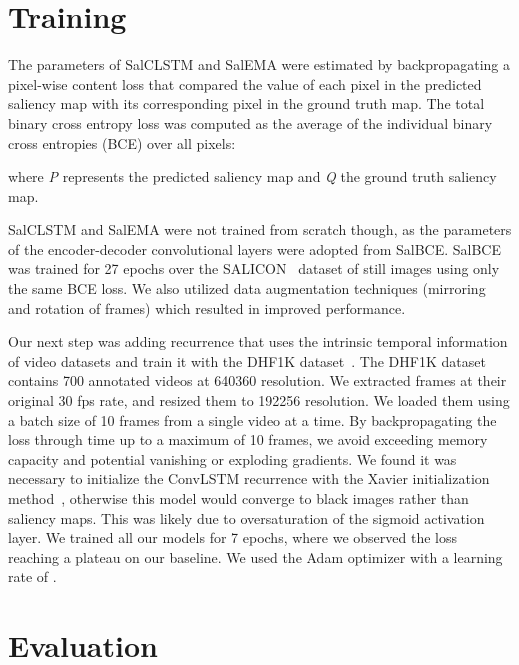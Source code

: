 \documentclass{bmvc2k}
\begin{document}
\section{Training}

The parameters of SalCLSTM and SalEMA were estimated by backpropagating a pixel-wise content loss that compared the value of each pixel in the predicted saliency map with its corresponding pixel in the ground truth map. The total binary cross entropy loss was computed as the average of the individual binary cross entropies (BCE) over all pixels:

where \textit{P} represents the predicted saliency map and {\it Q} the ground truth saliency map.

SalCLSTM and SalEMA were not trained from scratch though, as the parameters of the encoder-decoder convolutional layers were adopted from SalBCE.
SalBCE was trained for 27 epochs over the SALICON~\cite{SALICON} dataset of still images using only the same BCE loss. We also utilized data augmentation techniques (mirroring and rotation of frames) which resulted in improved performance.



Our next step was adding recurrence that uses the intrinsic temporal information of video datasets and train it with the DHF1K dataset~\cite{Wang2018a}. 
The DHF1K dataset \cite{Wang2018a} contains 700 annotated videos at 640360 resolution. We extracted frames at their original 30 fps rate, and resized them to 192256 resolution. We loaded them using a batch size of 10 frames from a single video at a time. By backpropagating the loss through time up to a maximum of 10 frames, we avoid exceeding memory capacity and potential vanishing or exploding gradients. We found it was necessary to initialize the ConvLSTM recurrence with the Xavier initialization method~\cite{Xavier_Initialization}, otherwise this model would converge to black images rather than saliency maps. This was likely due to oversaturation of the sigmoid activation layer. We trained all our models for 7 epochs, where we observed the loss reaching a plateau on our baseline. We used the Adam optimizer \cite{Adam} with a learning rate of .


\section{Evaluation}
\end{document}
